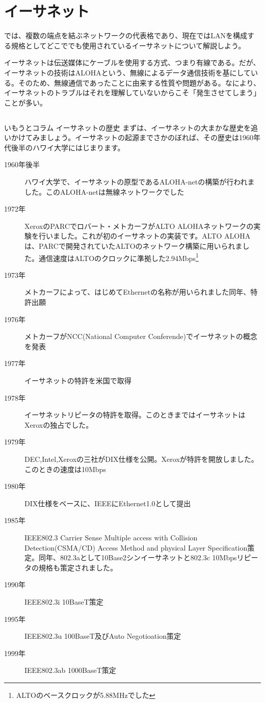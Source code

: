 \section{イーサネット}

では、複数の端点を結ぶネットワークの代表格であり、現在ではLANを構成する規格としてどこででも使用されているイーサネットについて解説しよう。

イーサネットは伝送媒体にケーブルを使用する方式、つまり有線である。だが、イーサネットの技術はALOHAという、無線によるデータ通信技術を基にしている。そのため、無線通信であったことに由来する性質や問題がある。なにより、イーサネットのトラブルはそれを理解していないからこそ「発生させてしまう」ことが多い。

\subsection*{}
\begin{itembox}[l]{いもうとコラム イーサネットの歴史}
まずは、イーサネットの大まかな歴史を追いかけてみましょう。イーサネットの起源までさかのぼれば、その歴史は1960年代後半のハワイ大学にはじまります。

\begin{description}
\item[1960年後半]ハワイ大学で、イーサネットの原型であるALOHA-netの構築が行われました。このALOHA-netは無線ネットワークでした
\item[1972年]XeroxのPARCでロバート・メトカーフがALTO ALOHAネットワークの実験を行いました。これが初のイーサネットの実装です。ALTO ALOHAは、PARCで開発されていたALTOのネットワーク構築に用いられました。通信速度はALTOのクロックに準拠した2.94Mbps\footnote{ALTOのベースクロックが5.88MHzでした}
\item[1973年]メトカーフによって、はじめてEthernetの名称が用いられました同年、特許出願
\item[1976年]メトカーフがNCC(National Computer Conferende)でイーサネットの概念を発表
\item[1977年]イーサネットの特許を米国で取得
\item[1978年]イーサネットリピータの特許を取得。このときまではイーサネットはXeroxの独占でした。
\item[1979年]DEC,Intel,Xeroxの三社がDIX仕様を公開。Xeroxが特許を開放しました。このときの速度は10Mbps
\item[1980年]DIX仕様をベースに、IEEEにEthernet1.0として提出
\item[1985年]IEEE802.3 Carrier Sense Multiple access with Collision Detection(CSMA/CD) Access Method and physical Layer Specification策定。同年、802.3aとして10Base2シンイーサネットと802.3c 10Mbpsリピータの規格も策定されました。
\item[1990年]IEEE802.3i 10BaseT策定
\item[1995年]IEEE802.3u 100BaseT及びAuto Negotioation策定
\item[1999年]IEEE802.3ab 1000BaseT策定
\end{description}

\end{itembox}


